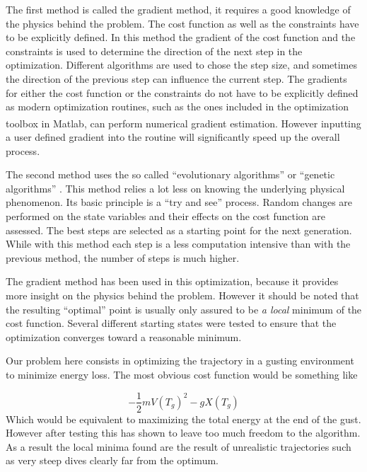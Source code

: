 \par The first method is called the gradient method, it requires a good knowledge of the physics behind the problem.
The cost function as well as the constraints have to be explicitly defined.
In this method the gradient of the cost function and the constraints is used to determine the direction of the next step in the optimization.
Different algorithms are used to chose the step size, and sometimes the direction of the previous step can influence the current step.
The gradients for either the cost function or the constraints do not have to be explicitly defined as modern optimization routines, such as the ones included in the optimization toolbox in  Matlab\textsuperscript{\textregistered}, can perform numerical gradient estimation.
However inputting a user defined gradient into the routine will significantly speed up the overall process.

\par The second method uses the so called ``evolutionary algorithms'' or ``genetic algorithms'' \cite{davis1991handbook}. 
This method relies a lot less on knowing the underlying physical phenomenon.
Its basic principle is a ``try and see'' process.
Random changes are performed on the state variables and their effects on the cost function are assessed.
The best steps are selected as a starting point for the next generation.
While with this method each step is a less computation intensive than with the previous method, the number of steps is much higher.

\par The gradient method has been used in this optimization, because it provides more insight on the physics behind the problem.
However it should be noted that the resulting ``optimal'' point is usually only assured to be \emph{a local} minimum of the cost function.
Several different starting states were tested to ensure that the optimization converges toward a reasonable minimum.

Our problem here consists in optimizing the trajectory in a gusting environment to minimize energy loss.
The most obvious cost function would be something like

\begin{equation}
  - \frac{1}{2}m{V(T_g)}^2 - gX(T_g)
  \label{eqn:eni_cost_fun}
\end{equation}
Which would be equivalent to maximizing the total energy at the end of the gust.
However after testing this has shown to leave too much freedom to the algorithm. 
As a result the local minima found are the result of unrealistic trajectories such as very steep dives clearly far from the optimum.

